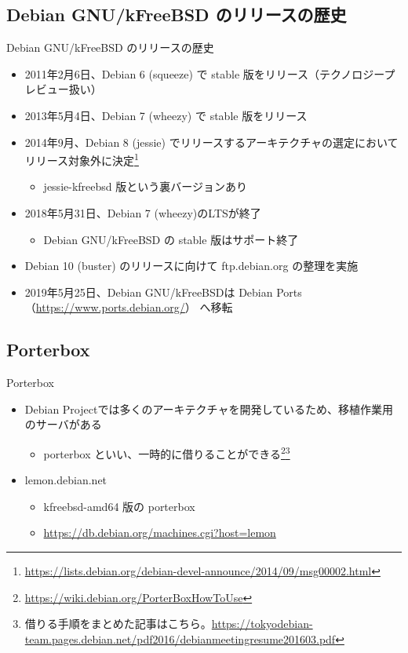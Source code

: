 \subsection{Debian GNU/kFreeBSD のリリースの歴史}
\begin{frame}{Debian GNU/kFreeBSD のリリースの歴史}
  \begin{itemize}
  \item 2011年2月6日、Debian 6 (squeeze) で stable 版をリリース（テクノロジープレビュー扱い）
  \item 2013年5月4日、Debian 7 (wheezy) で stable 版をリリース
  \item 2014年9月、Debian 8 (jessie) でリリースするアーキテクチャの選定においてリリース対象外に決定\footnote{\url{https://lists.debian.org/debian-devel-announce/2014/09/msg00002.html}}
    \begin{itemize}
    \item jessie-kfreebsd 版という裏バージョンあり
    \end{itemize}
  \item 2018年5月31日、Debian 7 (wheezy)のLTSが終了
    \begin{itemize}
    \item Debian GNU/kFreeBSD の stable 版はサポート終了
    \end{itemize}
  \item Debian 10 (buster) のリリースに向けて ftp.debian.org の整理を実施
  \item 2019年5月25日、Debian GNU/kFreeBSDは Debian Ports（\url{https://www.ports.debian.org/}） へ移転
  \end{itemize}
\end{frame}

\subsection{Porterbox}
\begin{frame}{Porterbox}
  \begin{itemize}
  \item Debian Projectでは多くのアーキテクチャを開発しているため、移植作業用のサーバがある
    \begin{itemize}
    \item porterbox といい、一時的に借りることができる\footnote{\url{https://wiki.debian.org/PorterBoxHowToUse}}\footnote{借りる手順をまとめた記事はこちら。\url{https://tokyodebian-team.pages.debian.net/pdf2016/debianmeetingresume201603.pdf}}
    \end{itemize}
  \item lemon.debian.net
    \begin{itemize}
    \item kfreebsd-amd64 版の porterbox
    \item \url{https://db.debian.org/machines.cgi?host=lemon}
    \end{itemize}
  \end{itemize}
\end{frame}



